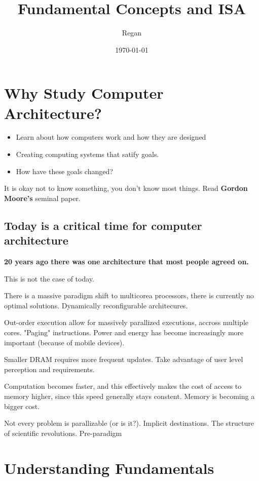 \documentclass[11pt]{article}
\author{Regan}
\date{\today}
\title{Fundamental Concepts and ISA}
\begin{document}
\maketitle
\tableofcontents



\section{Why Study Computer Architecture?}
\label{sec:orgheadline2}

\begin{itemize}
\item Learn about how computers work and how they are designed
\item Creating computing systems that satify goals.
\item How have these goals changed?
\end{itemize}

It is okay not to know something, you don't know most things.
Read \textbf{Gordon Moore's} seminal paper.

\subsection{Today is a critical time for computer architecture}
\label{sec:orgheadline1}

\textbf{20 years ago there was one architecture that most people agreed on.}

This is not the case of today.

There is a massive paradigm shift to multicorea processors, there
is currently no optimal solutions. Dynamically reconfigurable 
architecures.

Out-order execution allow for massively parallized executions,
accross multiple cores. "Paging" instructions. Power and energy
has become increasingly more important (because of mobile devices).

Smaller DRAM requires more frequent updates. Take advantage of user
level perception and requirements. 

Computation becomes faster, and this effectively makes the cost of 
access to memory higher, since this speed generally stays constent.
Memory is becoming a bigger cost.

Not every problem is parallizable (or is it?). Implicit destinations.
The structure of scientific revolutions. Pre-paradigm

\section{Understanding Fundamentals}
\label{sec:orgheadline7}
\end{document}
